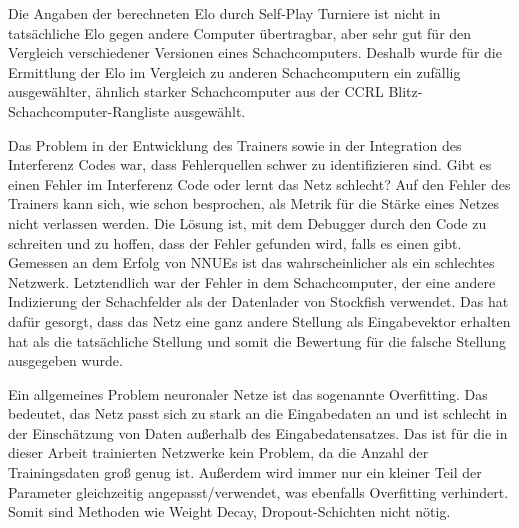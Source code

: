 Die Angaben der berechneten Elo durch Self-Play Turniere ist nicht in tatsächliche Elo gegen andere Computer übertragbar, aber sehr gut für den Vergleich verschiedener Versionen eines Schachcomputers. Deshalb wurde für die Ermittlung der Elo im Vergleich zu anderen Schachcomputern ein zufällig ausgewählter, ähnlich starker Schachcomputer aus der \ac{CCRL} \cite{CCRL} Blitz-Schachcomputer-Rangliste ausgewählt.

Das Problem in der Entwicklung des Trainers sowie in der Integration des Interferenz Codes war, dass Fehlerquellen schwer zu identifizieren sind. Gibt es einen Fehler im Interferenz Code oder lernt das Netz schlecht? Auf den Fehler des Trainers kann sich, wie schon besprochen, als Metrik für die Stärke eines Netzes nicht verlassen werden. Die Lösung ist, mit dem Debugger durch den Code zu schreiten und zu hoffen, dass der Fehler gefunden wird, falls es einen gibt. Gemessen an dem Erfolg von \acp{NNUE} ist das wahrscheinlicher als ein schlechtes Netzwerk. Letztendlich war der Fehler in dem Schachcomputer, der eine andere Indizierung der Schachfelder als der Datenlader von Stockfish verwendet. Das hat dafür gesorgt, dass das Netz eine ganz andere Stellung als Eingabevektor erhalten hat als die tatsächliche Stellung und somit die Bewertung für die falsche Stellung ausgegeben wurde.


Ein allgemeines Problem neuronaler Netze ist das sogenannte Overfitting. Das bedeutet, das Netz passt sich zu stark an die Eingabedaten an und ist schlecht in der Einschätzung von Daten außerhalb des Eingabedatensatzes. Das ist für die in dieser Arbeit trainierten Netzwerke kein Problem, da die Anzahl der Trainingsdaten groß genug ist. Außerdem wird immer nur ein kleiner Teil der Parameter gleichzeitig angepasst/verwendet, was ebenfalls Overfitting verhindert. Somit sind Methoden wie \zb{} Weight Decay, Dropout-Schichten nicht nötig.

